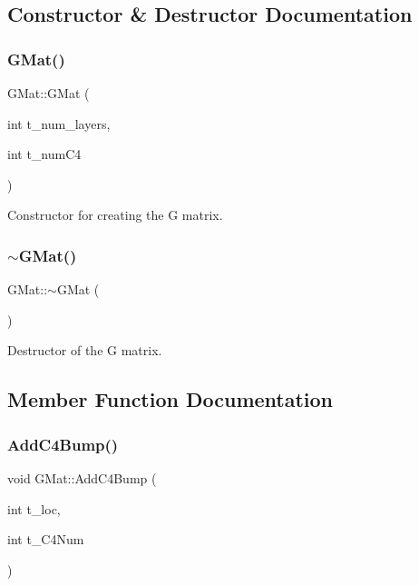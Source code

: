 \subsection{Constructor \& Destructor Documentation}
\mbox{\label{classGMat_ad89367522ad38208488689b4146b6bbc}} 
\subsubsection{\texorpdfstring{G\+Mat()}{GMat()}}
{\footnotesize\ttfamily G\+Mat\+::\+G\+Mat (\begin{DoxyParamCaption}\item[{int}]{t\+\_\+num\+\_\+layers,  }\item[{int}]{t\+\_\+num\+C4 }\end{DoxyParamCaption})\hspace{0.3cm}{\ttfamily [inline]}}



Constructor for creating the G matrix. 

\mbox{\label{classGMat_aeb2bc57952d6046f91afac0bcb3a7243}} 
\subsubsection{\texorpdfstring{$\sim$\+G\+Mat()}{~GMat()}}
{\footnotesize\ttfamily G\+Mat\+::$\sim$\+G\+Mat (\begin{DoxyParamCaption}{ }\end{DoxyParamCaption})\hspace{0.3cm}{\ttfamily [inline]}}



Destructor of the G matrix. 



\subsection{Member Function Documentation}
\mbox{\label{classGMat_a21ee1650f436e769255235d3b2fe8aa8}} 
\subsubsection{\texorpdfstring{Add\+C4\+Bump()}{AddC4Bump()}}
{\footnotesize\ttfamily void G\+Mat\+::\+Add\+C4\+Bump (\begin{DoxyParamCaption}\item[{int}]{t\+\_\+loc,  }\item[{int}]{t\+\_\+\+C4\+Num }\end{DoxyParamCaption})}



